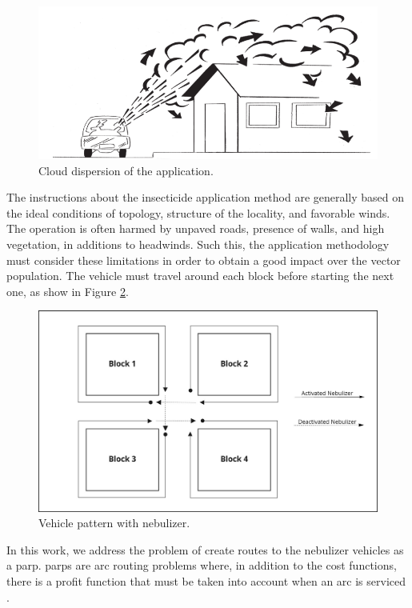 \documentclass[a4paper,11pt]{article}
\begin{document}
\begin{figure}[!ht]
  \centering
  \includegraphics[scale=0.4]{cloud-dispersion.png}
  \caption{Cloud dispersion of the application.}
  \label{fig:dispersion}
\end{figure}

The instructions about the insecticide application method are generally based on
the  ideal conditions  of topology,  structure  of the  locality, and  favorable
winds. The  operation is often harmed  by unpaved roads, presence  of walls, and
high  vegetation,  in  additions  to   headwinds.  Such  this,  the  application
methodology must  consider these limitations  in order  to obtain a  good impact
over the  vector population. The  vehicle must  travel around each  block before
starting the next one, as show in Figure \ref{fig:travel-pattern}.

\begin{figure}[!ht]
  \centering
  \includegraphics[scale=0.25]{visit-pattern.jpg}
  \caption{Vehicle pattern with nebulizer.}
  \label{fig:travel-pattern}
\end{figure}


In this work, we address the problem  of create routes to the nebulizer vehicles
as a \gls{parp}. \gls{parp}s are arc  routing problems where, in addition to the
cost functions, there is a profit function  that must be taken into account when
an arc is serviced \citep{araoz:2006}.
\end{document}
